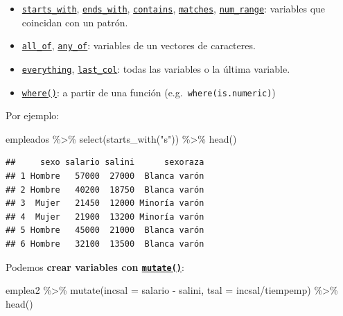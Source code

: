 \documentclass[
]{book}
\newenvironment{Shaded}{\begin{snugshade}}{\end{snugshade}}
\newcommand{\AttributeTok}[1]{\textcolor[rgb]{0.77,0.63,0.00}{#1}}
\newcommand{\FunctionTok}[1]{\textcolor[rgb]{0.00,0.00,0.00}{#1}}
\newcommand{\NormalTok}[1]{#1}
\newcommand{\SpecialCharTok}[1]{\textcolor[rgb]{0.00,0.00,0.00}{#1}}
\newcommand{\StringTok}[1]{\textcolor[rgb]{0.31,0.60,0.02}{#1}}
\theoremstyle{break}
\theoremstyle{nonumberplain}
\begin{document}
\begin{itemize}
\item
  \href{https://tidyselect.r-lib.org/reference/starts_with.html}{\texttt{starts\_with}}, \href{https://tidyselect.r-lib.org/reference/starts_with.html}{\texttt{ends\_with}}, \href{https://tidyselect.r-lib.org/reference/starts_with.html}{\texttt{contains}}, \href{https://tidyselect.r-lib.org/reference/starts_with.html}{\texttt{matches}}, \href{https://tidyselect.r-lib.org/reference/starts_with.html}{\texttt{num\_range}}: variables que coincidan con un patrón.
\item
  \href{https://tidyselect.r-lib.org/reference/all_of.html}{\texttt{all\_of}}, \href{https://tidyselect.r-lib.org/reference/all_of.html}{\texttt{any\_of}}: variables de un vectores de caracteres.
\item
  \href{https://tidyselect.r-lib.org/reference/everything.html}{\texttt{everything}}, \href{https://tidyselect.r-lib.org/reference/everything.html}{\texttt{last\_col}}: todas las variables o la última variable.
\item
  \href{https://tidyselect.r-lib.org/reference/where.html}{\texttt{where()}}: a partir de una función (e.g.~\texttt{where(is.numeric)})
\end{itemize}

Por ejemplo:

\begin{Shaded}
\begin{Highlighting}[]
\NormalTok{empleados }\SpecialCharTok{\%\textgreater{}\%} \FunctionTok{select}\NormalTok{(}\FunctionTok{starts\_with}\NormalTok{(}\StringTok{"s"}\NormalTok{)) }\SpecialCharTok{\%\textgreater{}\%} \FunctionTok{head}\NormalTok{()}
\end{Highlighting}
\end{Shaded}

\begin{verbatim}
##     sexo salario salini      sexoraza
## 1 Hombre   57000  27000  Blanca varón
## 2 Hombre   40200  18750  Blanca varón
## 3  Mujer   21450  12000 Minoría varón
## 4  Mujer   21900  13200 Minoría varón
## 5 Hombre   45000  21000  Blanca varón
## 6 Hombre   32100  13500  Blanca varón
\end{verbatim}

Podemos \textbf{crear variables con \href{https://dplyr.tidyverse.org/reference/mutate.html}{\texttt{mutate()}}}:

\begin{Shaded}
\begin{Highlighting}[]
\NormalTok{emplea2 }\SpecialCharTok{\%\textgreater{}\%} \FunctionTok{mutate}\NormalTok{(}\AttributeTok{incsal =}\NormalTok{ salario }\SpecialCharTok{{-}}\NormalTok{ salini, }\AttributeTok{tsal =}\NormalTok{ incsal}\SpecialCharTok{/}\NormalTok{tiempemp) }\SpecialCharTok{\%\textgreater{}\%} \FunctionTok{head}\NormalTok{()}
\end{Highlighting}
\end{Shaded}
\end{document}
